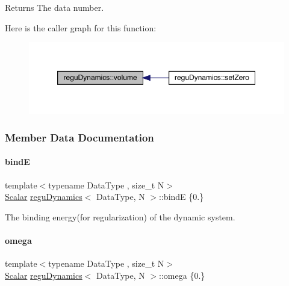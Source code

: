 \begin{DoxyReturn}{Returns}
The data number. 
\end{DoxyReturn}
Here is the caller graph for this function\+:\nopagebreak
\begin{figure}[H]
\begin{center}
\leavevmode
\includegraphics[width=350pt]{classregu_dynamics_a3a00b2009ce88898871ca024c30c6882_icgraph}
\end{center}
\end{figure}


\subsubsection{Member Data Documentation}
\mbox{\label{classregu_dynamics_a7e2b804745638810d38ed547487c26f2}} 
\paragraph{\texorpdfstring{bindE}{bindE}}
{\footnotesize\ttfamily template$<$typename Data\+Type , size\+\_\+t N$>$ \\
\mbox{\hyperlink{classregu_dynamics_a359c55370b4dee032396f0df86ad5fab}{Scalar}} \mbox{\hyperlink{classregu_dynamics}{regu\+Dynamics}}$<$ Data\+Type, N $>$\+::bindE \{0.\}}



The binding energy(for regularization) of the dynamic system. 

\mbox{\label{classregu_dynamics_afef2a874c21e951765e50a497a411eae}} 
\paragraph{\texorpdfstring{omega}{omega}}
{\footnotesize\ttfamily template$<$typename Data\+Type , size\+\_\+t N$>$ \\
\mbox{\hyperlink{classregu_dynamics_a359c55370b4dee032396f0df86ad5fab}{Scalar}} \mbox{\hyperlink{classregu_dynamics}{regu\+Dynamics}}$<$ Data\+Type, N $>$\+::omega \{0.\}}



